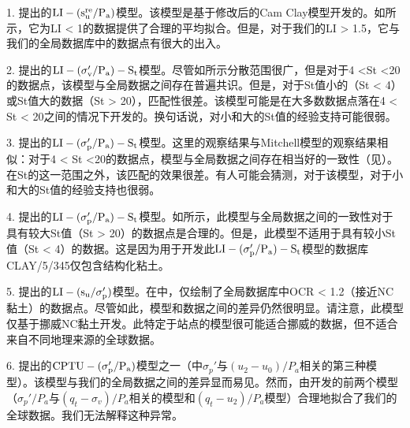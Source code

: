\begin{Parallel}{0.60\textwidth}{}
{        1. \citet{Wroth1978137}提出的$\rm{LI}-(s_u^{re}/P_a)$模型。该模型是基于修改后的Cam Clay模型开发的。如所示，它为LI < 1的数据提供了合理的平均拟合。但是，对于我们的LI > 1.5，它与我们的全局数据库中的数据点有很大的出入。

        2. \citet{Mitchell1993}提出的$\rm{LI}-(\sigma_v'/P_a)-S_t$模型。尽管如所示分散范围很广，但是对于4 <St <20的数据点，该模型与全局数据之间存在普遍共识。但是，对于St值小的（St < 4）或St值大的数据（St > 20），匹配性很差。该模型可能是在大多数数据点落在4 < St < 20之间的情况下开发的。换句话说，对小和大的St值的经验支持可能很弱。

        3. \citet{NAVFAC1982}提出的$\rm{LI}-(\sigma_p'/P_a)-S_t$模型。这里的观察结果与Mitchell模型的观察结果相似：对于4 < St <20的数据点，模型与全局数据之间存在相当好的一致性（见）。在St的这一范围之外，该匹配的效果很差。有人可能会猜测，对于该模型，对于小和大的St值的经验支持也很弱。

        4. \citet{Ching2012522}提出的$\rm{LI}-(\sigma_p'/P_a)-S_t$模型。如所示，此模型与全局数据之间的一致性对于具有较大St值（St > 20）的数据点是合理的。但是，此模型不适用于具有较小St值（St < 4）的数据。这是因为用于开发此$\rm{LI}-(\sigma_p'/P_a)-S_t$模型的数据库CLAY/5/345仅包含结构化粘土。
        
        5. \citet{Bjerrum1960711}提出的$\rm{LI}-(s_u/\sigma_p')$模型。在中，仅绘制了全局数据库中OCR < 1.2（接近NC黏土）的数据点。尽管如此，模型和数据之间的差异仍然很明显。请注意，此模型仅基于挪威NC黏土开发。此特定于站点的模型很可能适合挪威的数据，但不适合来自不同地理来源的全球数据。
        
        6. \citet{Chen1996488}提出的$\rm{CPTU}-(\sigma_p'/P_a)$模型之一（中$\sigma_p'$与$(u_2-u_0)/P_a$相关的第三种模型）。该模型与我们的全局数据之间的差异显而易见。然而，由\citet{Chen1996488}开发的前两个模型（$\sigma_p'/P_a$与$(q_t-\sigma_v)/P_a$相关的模型和$(q_t-u_2)/P_a$模型）合理地拟合了我们的全球数据。我们无法解释这种异常。
    }
    \ParallelPar
\end{Parallel}